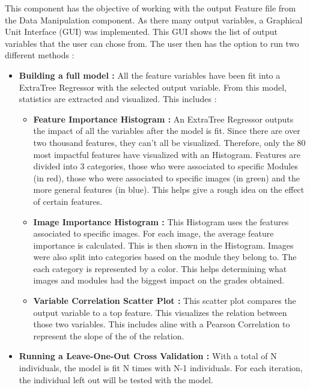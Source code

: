 \documentclass[a4paper,11pt]{report}
\numberwithin{figure}{section} %
\begin{document}
    This component has the objective of working with the output Feature file from the Data Manipulation component.
    As there many output variables, a Graphical Unit Interface (GUI) was implemented.
    This GUI shows the list of output variables that the user can chose from.
    The user then has the option to run two different methods :
    \begin{itemize}
        \item[\textbullet] \textbf{Building a full model :} All the feature variables have been fit into a ExtraTree Regressor with the selected output variable.
        From this model, statistics are extracted and visualized.
        This includes :
        \begin{itemize}
            \item \textbf{Feature Importance Histogram :} An ExtraTree Regressor outputs the impact of all the variables after the model is fit.
            Since there are over two thousand features, they can't all be visualized.
            Therefore, only the 80 most impactful features have visualized with an Histogram.
            Features are divided into 3 categories, those who were associated to specific Modules (in red), those who were associated to specific images (in green) and the more general features (in blue).
            This helps give a rough idea on the effect of certain features.
            \item \textbf{Image Importance Histogram :} This Histogram uses the features associated to specific images.
            For each image, the average feature importance is calculated.
            This is then shown in the Histogram.
            Images were also split into categories based on the module they belong to.
            The each category is represented by a color.
            This helps determining what images and modules had the biggest impact on the grades obtained.
            \item \textbf{Variable Correlation Scatter Plot :} This scatter plot compares the output variable to a top feature.
            This visualizes the relation between those two variables.
            This includes aline with a Pearson Correlation to represent the slope of the of the relation.
        \end{itemize}
        \item \textbf{Running a Leave-One-Out Cross Validation :} With a total of N individuals, the model is fit N times with N-1 individuals.
        For each iteration, the individual left out will be tested with the model.

\end{itemize}
\end{document}
